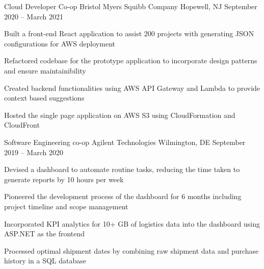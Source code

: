 \begin{cventries}
	\vspace{-2mm}
	\cventry
	{Cloud Developer Co-op}
	{Bristol Myers Squibb Company}
	{Hopewell, NJ}
	{September 2020 – March 2021}
	{\begin{cvitems}
        \item {Built a front-end React application to assist 200 projects with generating JSON configurations for AWS deployment}
        \item {Refactored codebase for the prototype application to incorporate design patterns and ensure maintainibility}
        \item {Created backend functionalities using AWS API Gateway and Lambda to provide context based suggestions}
        \item {Hosted the single page application on AWS S3 using CloudFormation and CloudFront}
		\end{cvitems}}
	
	\vspace{-2mm}
	\cventry
	{Software Engineering co-op}
	{Agilent Technologies}
	{Wilmington, DE}
	{September 2019 – March 2020}
	{\begin{cvitems}
	    \item {Devised a dashboard to automate routine tasks, reducing the time taken to generate reports by 10 hours per week}
        \item {Pioneered the development process of the dashboard for 6 months including project timeline and scope management}
		\item {Incorporated KPI analytics for 10+ GB of logistics data into the dashboard using ASP.NET as the frontend}
        \item {Processed optimal shipment dates by combining raw shipment data and purchase history in a SQL database}
		\end{cvitems}}
	

\end{cventries}
